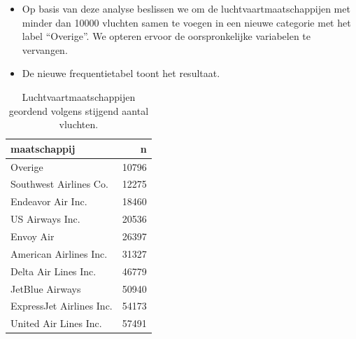 \documentclass[]{tufte-book}
\newenvironment{Shaded}{}{}
\newcommand{\DataTypeTok}[1]{\textcolor[rgb]{0.56,0.13,0.00}{#1}}
\newcommand{\DecValTok}[1]{\textcolor[rgb]{0.25,0.63,0.44}{#1}}
\newcommand{\KeywordTok}[1]{\textcolor[rgb]{0.00,0.44,0.13}{\textbf{#1}}}
\newcommand{\NormalTok}[1]{#1}
\newcommand{\OperatorTok}[1]{\textcolor[rgb]{0.40,0.40,0.40}{#1}}
\newcommand{\StringTok}[1]{\textcolor[rgb]{0.25,0.44,0.63}{#1}}
\providecommand{\tightlist}{%
  \setlength{\itemsep}{0pt}\setlength{\parskip}{0pt}}
\begin{document}
\begin{itemize}
\tightlist
\item
  Op basis van deze analyse beslissen we om de luchtvaartmaatschappijen met minder dan 10000 vluchten samen te voegen in een nieuwe categorie met het label ``Overige''. We opteren ervoor de oorspronkelijke variabelen te vervangen.
\end{itemize}

\begin{Shaded}
\end{Shaded}

\begin{itemize}
\tightlist
\item
  De nieuwe frequentietabel toont het resultaat.
\end{itemize}

\begin{Shaded}
\end{Shaded}

\begin{table}

\caption{\label{tab:5-24b}Luchtvaartmaatschappijen geordend volgens stijgend aantal vluchten.}
\centering
\fontsize{10}{12}\selectfont
\begin{tabular}[t]{lr}
\toprule
maatschappij & n\\
\midrule
Overige & 10796\\
Southwest Airlines Co. & 12275\\
Endeavor Air Inc. & 18460\\
US Airways Inc. & 20536\\
Envoy Air & 26397\\
\addlinespace
American Airlines Inc. & 31327\\
Delta Air Lines Inc. & 46779\\
JetBlue Airways & 50940\\
ExpressJet Airlines Inc. & 54173\\
United Air Lines Inc. & 57491\\
\bottomrule
\end{tabular}
\end{table}
\end{document}
